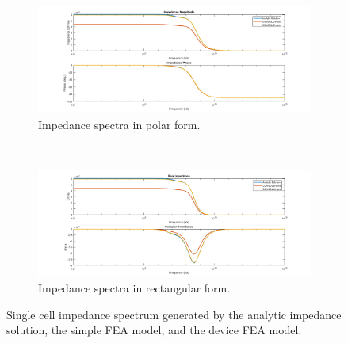 \begin{figure}[h]
    \centering
    \begin{subfigure}[b]{\textwidth}
        \centering
        \includegraphics[width=\textwidth]{images/IS_model_mag_phase.png}
        \caption{Impedance spectra in polar form.}
    \end{subfigure}
    \\
    \vspace{0.1 in}
    \begin{subfigure}[b]{\textwidth}
        \centering
        \includegraphics[width=\textwidth]{images/IS_model_real_imag.png}
        \caption{Impedance spectra in rectangular form.}
    \end{subfigure}
    \caption[Analyitic and FEA generated single cell impedance spectrums]{Single cell impedance spectrum generated by the analytic impedance solution, the simple FEA model, and the device FEA model.}
    \label{fig:single_cell_model_IS_data}
\end{figure}

